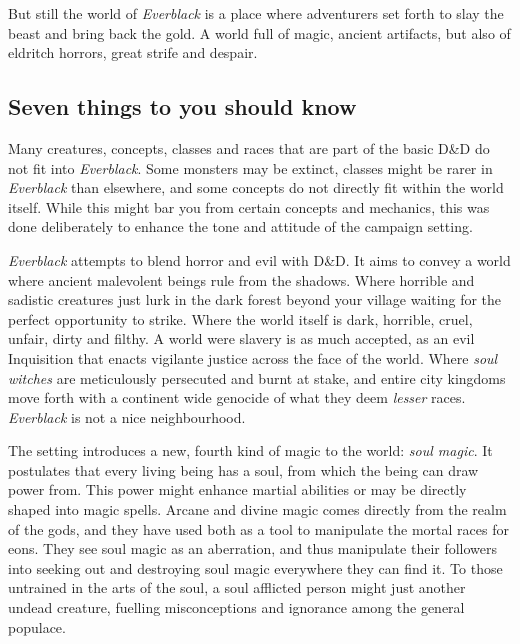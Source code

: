 But still the world of \emph{Everblack} is a place where adventurers set forth
to slay the beast and bring back the gold. A world full of magic, ancient
artifacts, but also of eldritch horrors, great strife and despair.

\subsection{Seven things to you should know}

\begin{enumerate}
  Many creatures, concepts, classes and
 races that are part of the basic D\&D do not fit into \emph{Everblack}. Some
 monsters may be extinct, classes might be rarer in \emph{Everblack} than
 elsewhere, and some concepts do not directly fit within the world
 itself. While this might bar you from certain concepts and mechanics, this
 was done deliberately to enhance the tone and attitude of the campaign
 setting.

  \emph{Everblack} attempts to blend horror and evil with
 D\&D. It aims to convey a world where ancient malevolent beings rule from the
 shadows. Where horrible and sadistic creatures just lurk in the dark forest
 beyond your village waiting for the perfect opportunity to strike. Where the
 world itself is dark, horrible, cruel, unfair, dirty and filthy. A world were
 slavery is as much accepted, as an evil Inquisition that enacts vigilante
 justice across the face of the world. Where \emph{soul witches} are
 meticulously persecuted and burnt at stake, and entire city kingdoms move
 forth with a continent wide genocide of what they deem \emph{lesser} races.
 \emph{Everblack} is not a nice neighbourhood.

  The setting introduces a new, fourth kind of magic to the
 world: \emph{soul magic}. It postulates that every living being has a soul,
 from which the being can draw power from. This power might enhance martial
 abilities or may be directly shaped into magic spells. Arcane and divine
 magic comes directly from the realm of the gods, and they have used both as a
 tool to manipulate the mortal races for eons. They see soul magic as an
 aberration, and thus manipulate their followers into seeking out and
 destroying soul magic everywhere they can find it. To those untrained in the
 arts of the soul, a soul afflicted person might just another undead creature,
 fuelling misconceptions and ignorance among the general populace.


\end{enumerate}
